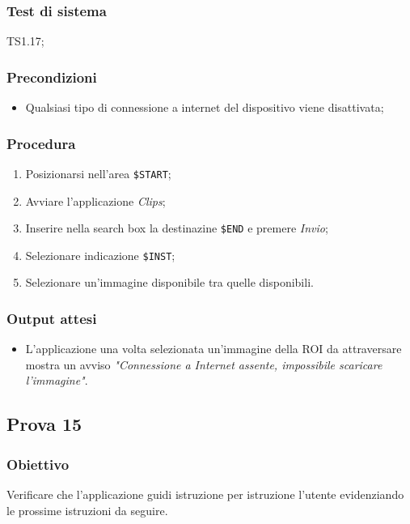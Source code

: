 \documentclass[../SperimentazioniPratiche.tex]{subfiles}
\begin{document}
	\subsubsection{Test di sistema}
		TS1.17;
		
	\subsubsection{Precondizioni}
		\begin{itemize}
			\item Qualsiasi tipo di connessione a internet del dispositivo viene disattivata;
		\end{itemize}				
		
	\subsubsection{Procedura}
		\begin{enumerate}
		\item Posizionarsi nell'area \verb|$START|;
		\item Avviare l'applicazione \textit{Clips};
		\item Inserire nella search box la destinazine  \verb|$END| e premere \textit{Invio};
		\item Selezionare indicazione  \verb|$INST|;
		\item Selezionare un'immagine disponibile tra quelle disponibili.
		\end{enumerate}

	\subsubsection{Output attesi}
		\begin{itemize}
		\item L'applicazione una volta selezionata un'immagine della ROI da attraversare mostra un avviso \textit{"Connessione a Internet assente, impossibile scaricare l'immagine"}.
		\end{itemize}

		
\newpage	
\subsection{Prova 15} %
\label{subsec:Prova15}	
	
	\subsubsection{Obiettivo}
		Verificare che l'applicazione guidi istruzione per istruzione l'utente evidenziando le prossime istruzioni da seguire.
		
\end{document}
